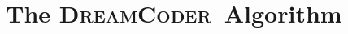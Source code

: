 \documentclass{article}
\newcommand{\system}{\textsc{DreamCoder}~}
\newcommand{\probability}{\mathds{P}} %
\begin{document}
 






\section{The \system Algorithm}
\end{document}
